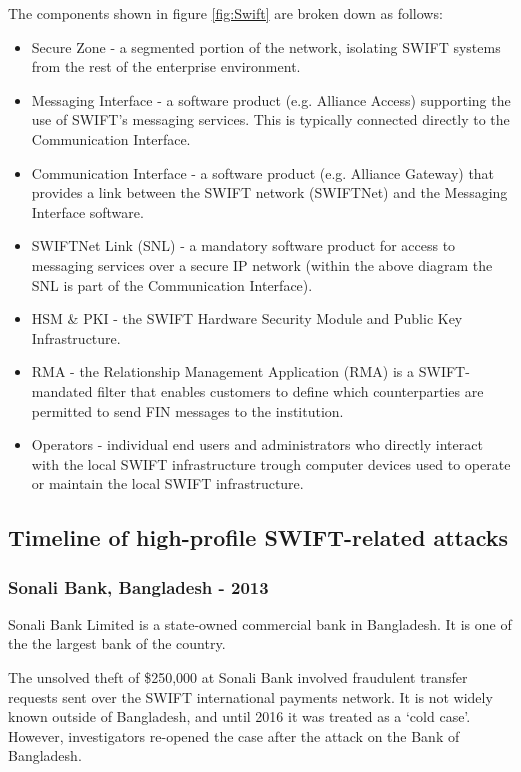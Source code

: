 \documentclass[12pt]{article}
\begin{document}
        The components shown in figure \ref{fig:Swift} are broken down as follows:
        \begin{itemize}
            \item Secure Zone - a segmented portion of the network, isolating SWIFT systems from the rest of the enterprise environment.
            \item Messaging Interface - a software product (e.g. Alliance Access) supporting the use of SWIFT’s messaging services. This is typically connected directly to the Communication Interface.
            \item Communication Interface - a software product (e.g. Alliance Gateway) that provides a link between the SWIFT network (SWIFTNet) and the Messaging Interface software.
            \item  SWIFTNet Link (SNL) - a mandatory software product for access to messaging services over a secure IP network (within the above diagram the SNL is part of the Communication Interface).
            \item HSM & PKI - the SWIFT Hardware Security Module and Public Key Infrastructure.
            \item  RMA - the Relationship Management Application (RMA) is a SWIFT-mandated filter that enables customers to define which counterparties are permitted to send FIN messages to the institution.
            \item Operators -  individual end users and administrators who directly interact with the local SWIFT infrastructure trough computer devices used to operate or maintain the local SWIFT infrastructure.
        \end{itemize}
        
    \subsection{Timeline of high-profile SWIFT-related attacks}
    
    \subsubsection{Sonali Bank, Bangladesh - 2013}
        Sonali Bank Limited is a state-owned commercial bank in Bangladesh. It is one of the the largest bank of the country.
        
        The unsolved theft of \$250,000 at Sonali Bank involved fraudulent transfer requests sent over the SWIFT international payments network. It is not widely known outside of Bangladesh, and until 2016 it was treated as a ‘cold case’. However, investigators re-opened the case after the attack on the Bank of Bangladesh. 
        
\end{document}
